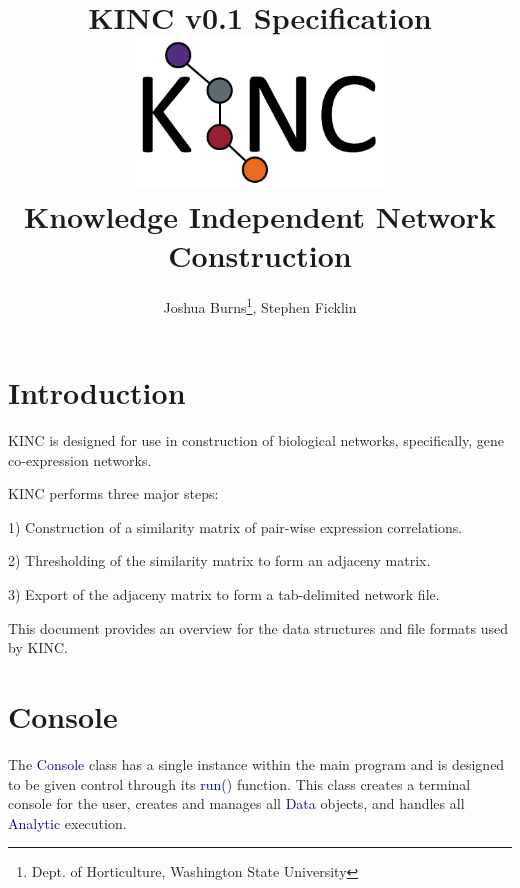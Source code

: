 \documentclass[10pt]{article}
\providecommand{\h}[1]{\textcolor{darkblue}{#1}}
\begin{document}
\title{\textbf{KINC v0.1 Specification}\\
\vspace{1mm}
\includegraphics[width=8cm,height=4cm]{KINClogo.png}
\\Knowledge Independent Network Construction}
\author{Joshua Burns\thanks{Dept. of Horticulture, Washington State 
University}, Stephen Ficklin\footnotemark[1]}
\maketitle

\newpage
\tableofcontents

\newpage
\section{Introduction}

KINC is designed for use in construction of biological networks, specifically, 
gene co-expression networks.

KINC performs three major steps:

\begin{list}{}{}
\item[1)] Construction of a similarity matrix of pair-wise expression 
correlations.
\item[2)] Thresholding of the similarity matrix to form an adjaceny matrix.
\item[3)] Export of the adjaceny matrix to form a tab-delimited network file.
\end{list}

This document provides an overview for the data structures and file formats 
used 
by KINC. 

\newpage
\section{Console}

The \h{Console} class has a single instance within the main program and is 
designed to be given control through its \h{run()} 
function. This class creates a terminal console for the user, creates and 
manages all \h{Data} objects, and handles all \h{Analytic} execution.
\end{document}
